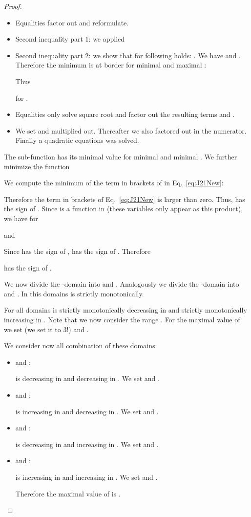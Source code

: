 \documentclass{article}
\begin{document}
\begin{proof}
\begin{itemize}
\item Equalities factor out  and reformulate.

\item Second inequality part 1: we applied

\item Second inequality part 2: we show that for  following holds:
. 
We have  and
 . 
Therefore the minimum is at border for minimal  and maximal :

Thus

for .

\item Equalities only solve square root and factor out the resulting
  terms  and .

\item We set  and multiplied out. Thereafter we
  also factored out  in the numerator. Finally a quadratic
  equations was solved. 
\end{itemize}

The sub-function has its minimal value for 
minimal
 and  minimal 
. 
We further minimize the function



We compute the minimum of the term in brackets of 
in Eq.~\eqref{eq:J21New}:  

Therefore the term in brackets  of Eq.~\eqref{eq:J21New}
is larger than zero.
Thus, 
has the sign of .
Since  is a function in 
(these variables only appear as this product), we
have for 

and 



Since  has the sign of , 
  has the sign of .
Therefore

has the sign of .


We now divide the -domain into
 and .
Analogously we divide the -domain into
 and .
In this domains  is strictly monotonically.

For all domains
 is strictly monotonically decreasing in 
and strictly monotonically increasing in .
Note that we now consider the range  .
For the maximal value of  we set   (we set it to 3!)
and .

We consider now all combination of these domains:
\begin{itemize}
\item  and :

 is decreasing in   and decreasing in .
We set   and  .


\item  and :

 is increasing in  and decreasing in .
We set   and  .




\item  and :

 is decreasing in  and increasing in .
We set   and  .


\item  and :

 is increasing in  and increasing in .
We set   and  .


Therefore the maximal value of  is  .
\end{itemize}


\end{proof}
\end{document}
